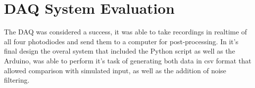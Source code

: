 \section{\acf{DAQ} System Evaluation}
The \ac{DAQ} was considered a success, it was able to take recordings in realtime of all four photodiodes and send them to a computer for post-processing. In it's final design the overal system that included the Python script as well as the Arduino, was able to perform it's task of generating both data in csv format that allowed comparison with simulated input, as well as the addition of noise filtering. %

%         





